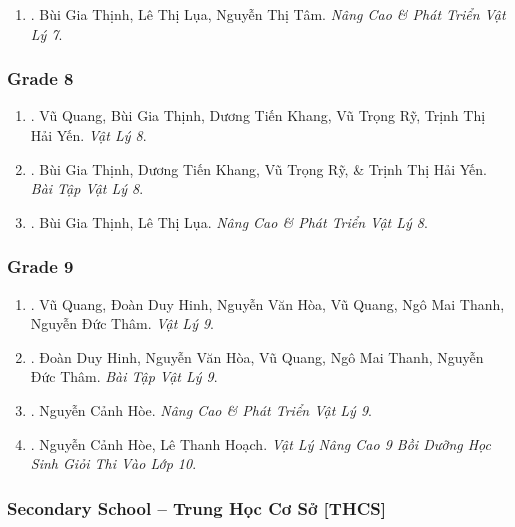 \documentclass{article}
\begin{document}
\begin{enumerate}
	\item \cite{Thinh_Lua_ncpt_Vat_Ly_7}. Bùi Gia Thịnh, Lê Thị Lụa, Nguyễn Thị Tâm. \textit{Nâng Cao \& Phát Triển Vật Lý 7}.\hfill{}
\end{enumerate}

\subsubsection{Grade 8}

\begin{enumerate}
	\item \cite{SGK_Vat_Ly_8}. Vũ Quang, Bùi Gia Thịnh, Dương Tiến Khang, Vũ Trọng Rỹ, Trịnh Thị Hải Yến. \textit{Vật Lý 8}.\hfill{\sf[downloaded]}
	\item \cite{SBT_Vat_Ly_8}. Bùi Gia Thịnh, Dương Tiến Khang, Vũ Trọng Rỹ, \& Trịnh Thị Hải Yến. \textit{Bài Tập Vật Lý 8}.\hfill{\sf[downloaded]}
	\item \cite{Thinh_Lua_ncpt_Vat_Ly_8}. Bùi Gia Thịnh, Lê Thị Lụa. \textit{Nâng Cao \& Phát Triển Vật Lý 8}.\hfill{}
\end{enumerate}

\subsubsection{Grade 9}

\begin{enumerate}
	\item \cite{SGK_Vat_Ly_9}. Vũ Quang, Đoàn Duy Hinh, Nguyễn Văn Hòa, Vũ Quang, Ngô Mai Thanh, Nguyễn Đức Thâm. \textit{Vật Lý 9}.\\\mbox{}\hfill{}
	\item \cite{SBT_Vat_Ly_9}. Đoàn Duy Hinh, Nguyễn Văn Hòa, Vũ Quang, Ngô Mai Thanh, Nguyễn Đức Thâm. \textit{Bài Tập Vật Lý 9}.\\\mbox{}\hfill{}
	\item \cite{Hoe_Vat_Ly_9}. Nguyễn Cảnh Hòe. \textit{Nâng Cao \& Phát Triển Vật Lý 9}.\hfill{}
	\item \cite{Hoe_Hoach_Vat_Ly_nang_cao_9}. Nguyễn Cảnh Hòe, Lê Thanh Hoạch. \textit{Vật Lý Nâng Cao 9 Bồi Dưỡng Học Sinh Giỏi Thi Vào Lớp 10}.\hfill{}
\end{enumerate}

\subsubsection{Secondary School -- Trung Học Cơ Sở [THCS]}
\end{document}

